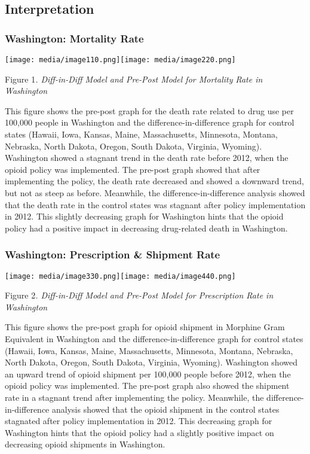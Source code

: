 \documentclass{article}
\begin{document}
\hypertarget{interpretation}{%
\subsection{Interpretation}\label{interpretation}}

\hypertarget{washington-mortality-rate}{%
\subsubsection{Washington: Mortality
Rate}\label{washington-mortality-rate}}

\texttt{[image: media/image110.png]}\texttt{[image: media/image220.png]}

Figure 1\emph{. Diff-in-Diff Model and Pre-Post Model for Mortality Rate
in Washington}

This figure shows the pre-post graph for the death rate related to drug
use per 100,000 people in Washington and the difference-in-difference
graph for control states (Hawaii, Iowa, Kansas, Maine, Massachusetts,
Minnesota, Montana, Nebraska, North Dakota, Oregon, South Dakota,
Virginia, Wyoming). Washington showed a stagnant trend in the death rate
before 2012, when the opioid policy was implemented. The pre-post graph
showed that after implementing the policy, the death rate decreased and
showed a downward trend, but not as steep as before. Meanwhile, the
difference-in-difference analysis showed that the death rate in the
control states was stagnant after policy implementation in 2012. This
slightly decreasing graph for Washington hints that the opioid policy
had a positive impact in decreasing drug-related death in Washington.

\hypertarget{washington-prescription-shipment-rate}{%
\subsubsection{Washington: Prescription \& Shipment
Rate}\label{washington-prescription-shipment-rate}}

\texttt{[image: media/image330.png]}\texttt{[image: media/image440.png]}

Figure 2\emph{. Diff-in-Diff Model and Pre-Post Model for Prescription
Rate in Washington}

This figure shows the pre-post graph for opioid shipment in Morphine
Gram Equivalent in Washington and the difference-in-difference graph for
control states (Hawaii, Iowa, Kansas, Maine, Massachusetts, Minnesota,
Montana, Nebraska, North Dakota, Oregon, South Dakota, Virginia,
Wyoming). Washington showed an upward trend of opioid shipment per
100,000 people before 2012, when the opioid policy was implemented. The
pre-post graph also showed the shipment rate in a stagnant trend after
implementing the policy. Meanwhile, the difference-in-difference
analysis showed that the opioid shipment in the control states stagnated
after policy implementation in 2012. This decreasing graph for
Washington hints that the opioid policy had a slightly positive impact
on decreasing opioid shipments in Washington.
\end{document}
